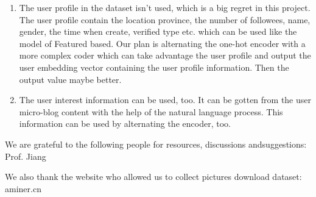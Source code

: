 \documentclass{acmtog} %
\begin{document}
\begin{enumerate}
    \item The user profile in the dataset isn't used, which is a big regret in this project. The user profile contain the location
province, the number of followees, name, gender, the time when create, verified type etc. which can be used like the model of Featured based. Our plan is alternating the one-hot encoder with a more complex coder which can take advantage the user profile and output the user embedding vector containing the user profile information. Then the output value maybe better.
    
    \item The user interest information can be used, too. It can be gotten from the user micro-blog content with the help of the  natural language process. This information can be used by alternating the encoder, too.

\end{enumerate}

\begin{acks}   %
We are grateful to the following people for resources, discussions andsuggestions: Prof. Jiang

We also thank the website who allowed us to collect pictures download dataset: aminer.cn
\end{acks}




\end{document}
